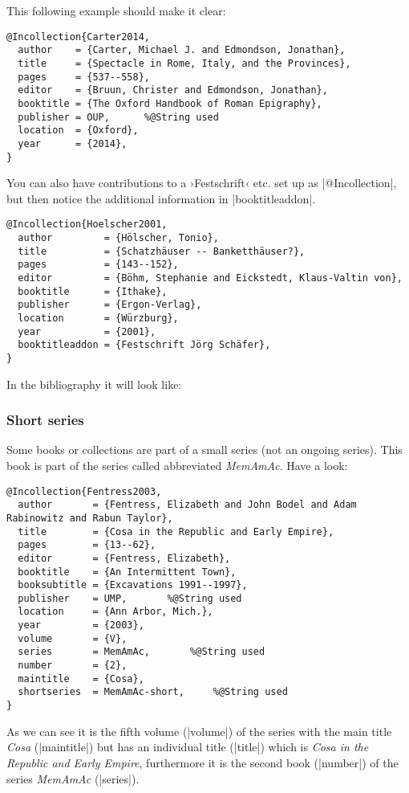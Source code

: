 \documentclass[a4paper,
10pt,
greek,
french,
spanish,
italian,
ngerman,
english
]{ltxdoc}
\begin{document}
 
 
This following example should make it clear:
 \begin{lstlisting}[style=bibentry,label=Carter2014,caption={{@}Incollection\{Carter2014,…\} }]
@Incollection{Carter2014,
  author    = {Carter, Michael J. and Edmondson, Jonathan},
  title     = {Spectacle in Rome, Italy, and the Provinces},
  pages     = {537--558},
  editor    = {Bruun, Christer and Edmondson, Jonathan},
  booktitle = {The Oxford Handbook of Roman Epigraphy},
  publisher = OUP,		%@String used
  location  = {Oxford},
  year      = {2014},
}
\end{lstlisting}


You can also have contributions to a ›Festschrift‹ etc. set up as |@Incollection|,
but then notice the additional information in |booktitleaddon|.
\begin{lstlisting}[style=bibentry,label=Hoelscher2001,caption={{@}Incollection\{Hoelscher2001,…\} }]
@Incollection{Hoelscher2001,
  author         = {Hölscher, Tonio},
  title          = {Schatzhäuser -- Banketthäuser?},
  pages          = {143--152},
  editor         = {Böhm, Stephanie and Eickstedt, Klaus-Valtin von},
  booktitle      = {Ithake},
  publisher      = {Ergon-Verlag},
  location       = {Würzburg},
  year           = {2001},
  booktitleaddon = {Festschrift Jörg Schäfer},
}
\end{lstlisting}
In the bibliography it will look like:

 \subsubsection{Short  series}
Some books or collections are part of a small series (not an ongoing series).
This book is part of the series called abbreviated \emph{MemAmAc}.
Have a look:
\begin{lstlisting}[style=bibentry,label=Fentress2003,caption={{@}Incollection\{Fentress2003,…\} }]
@Incollection{Fentress2003,
  author       = {Fentress, Elizabeth and John Bodel and Adam Rabinowitz and Rabun Taylor},
  title        = {Cosa in the Republic and Early Empire},
  pages        = {13--62},
  editor       = {Fentress, Elizabeth},
  booktitle    = {An Intermittent Town},
  booksubtitle = {Excavations 1991--1997},
  publisher    = UMP,		%@String used
  location     = {Ann Arbor, Mich.},
  year         = {2003},
  volume       = {V},
  series       = MemAmAc,		%@String used
  number       = {2},
  maintitle    = {Cosa},
  shortseries  = MemAmAc-short,		%@String used
}
\end{lstlisting}
As we can see it is the fifth volume (|volume|) of the series with the main title \emph{Cosa} (|maintitle|) but has an individual title (|title|) which is \emph{Cosa in the Republic and Early Empire}, furthermore it is the second book (|number|) of the series  \emph{MemAmAc} (|series|).
\end{document}
